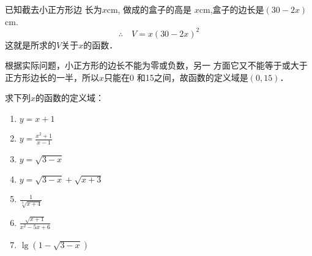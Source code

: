 \begin{solution}
    已知截去小正方形边
    长为$x$cm, 做成的盒子的高是
    $x$cm,盒子的边长是$(30-2x)$cm.
\[\therefore\quad     V=x(30-2x)^2\]
    这就是所求的$V$关于$x$的函数．

    根据实际问题，小正方形的边长不能为零或负数，另一
    方面它又不能等于或大于正方形边长的一半，所以$x$只能在0
    和15之间，故函数的定义域是$(0,15)$．
\end{solution}

\begin{example}    
    求下列$x$的函数的定义域：
    \begin{multicols}{2}
\begin{enumerate}
    \item $y=x+1$
    \item $y=\frac{x^2+1}{x-1}$
    \item $y=\sqrt{3-x}$
    \item $y=\sqrt{3-x}+\sqrt{x+3}$
    \item $\frac{1}{\sqrt[3]{x+4}}$
    \item $\frac{\sqrt{x+1}}{x^2-5x+6}$
    \item $\lg(1-\sqrt{3-x})$
\end{enumerate}        
    \end{multicols}
\end{example}

